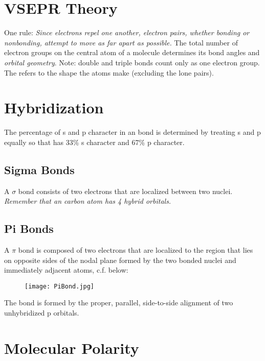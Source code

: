\documentclass[../GChemReview.tex]{subfiles}
\begin{document}
  \section{VSEPR Theory}

  One rule: \emph{Since electrons repel one another, electron pairs, whether
  bonding or nonbonding, attempt to move as far apart as possible.} The total
  number of electron groups on the central atom of a molecule determines its
  bond angles and \emph{orbital geometry}. Note: double and triple bonds count
  only as one electron group.\\ The  refers to the
  shape the atoms make (excluding the lone pairs).

  \section{Hybridization}

  The percentage of s and p character in an  bond is determined
  by treating s and p equally so that  has 33\% s character and
  67\% p character.

  \subsection{Sigma Bonds}

  A $ \sigma $ bond consists of two electrons that are localized between two
  nuclei. \emph{Remember that an  carbon atom has 4
   hybrid orbitals.}

  \subsection{Pi Bonds}

  A $ \pi $ bond is composed of two electrons that are localized to the region
  that lies on opposite sides of the nodal plane formed by the two bonded nuclei
  and immediately adjacent atoms, c.f. below:

  \begin{figure}[h]
    \centering
    \texttt{[image: PiBond.jpg]}
  \end{figure}

  The bond is formed by the proper, parallel, side-to-side alignment of two
  unhybridized p orbitals.

  \section{Molecular Polarity}
\end{document}

